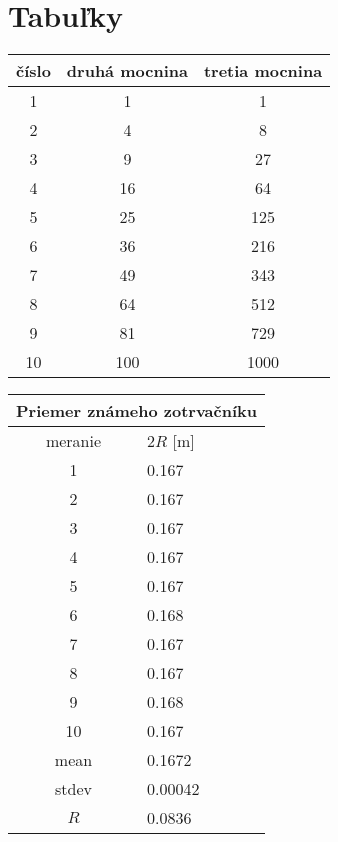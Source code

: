 \section{Tabuľky}


\begin{minipage}[c]{0.5\textwidth}
	\centering
	\label{table:druhe-a-tretie-mocniny}
	\begin{tabular}{| c | c | c |}
		\hline
		číslo & druhá mocnina & tretia mocnina\\
		\hline
		1 & 1 & 1\\
		2 & 4 & 8\\
		3 & 9 & 27\\
		4 & 16 & 64\\
		5 & 25 & 125\\
		6 & 36 & 216\\
		7 & 49 & 343\\
		8 & 64 & 512\\
		9 & 81 & 729\\
		10 & 100 & 1000\\
		\hline
	\end{tabular}
\end{minipage}
\begin{minipage}[c]{0.5\textwidth}
	\centering
	\label{tab:R}
	\begin{tabular}{|ll|}
		\hline
		\multicolumn{2}{|c|}{Priemer známeho zotrvačníku}    \\ \hline
		\multicolumn{1}{|c|}{meranie} & $2R$ {[}\si{\metre}{]}   \\ \hline
		\multicolumn{1}{|c|}{1}       & 0.167                \\ 
		\multicolumn{1}{|c|}{2}       & 0.167                \\ 
		\multicolumn{1}{|c|}{3}       & 0.167                \\ 
		\multicolumn{1}{|c|}{4}       & 0.167                \\ 
		\multicolumn{1}{|c|}{5}       & 0.167                \\ 
		\multicolumn{1}{|c|}{6}       & 0.168                \\ 
		\multicolumn{1}{|c|}{7}       & 0.167                \\ 
		\multicolumn{1}{|c|}{8}       & 0.167                \\ 
		\multicolumn{1}{|c|}{9}       & 0.168                \\ 
		\multicolumn{1}{|c|}{10}      & 0.167                \\ \hline
		\multicolumn{1}{|c|}{mean}    & 0.1672               \\ 
		\multicolumn{1}{|c|}{stdev}     & 0.00042 \\ \hline
		\multicolumn{1}{|c|}{$R$}       & 0.0836               \\ \hline
	\end{tabular}
\end{minipage}

\vspace{20pt}